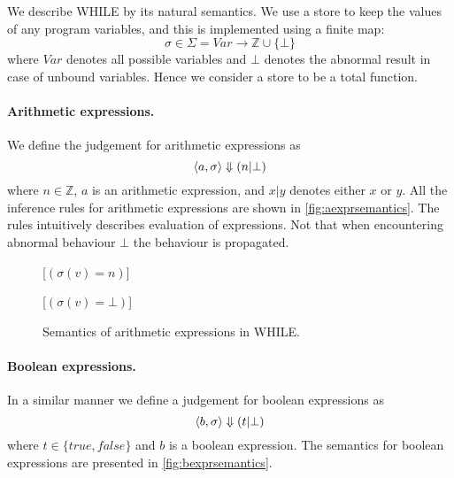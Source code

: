 We describe WHILE by its natural semantics.
We use a store to keep the values of any program variables, and this is implemented using a finite map:
$$\sigma \in \Sigma = Var \longrightarrow \mathbb{Z} \cup \{\bot\}$$
where $Var$ denotes all possible variables and $\bot$ denotes the abnormal result in case of unbound variables.
Hence we consider a store to be a total function.

\paragraph{Arithmetic expressions.}
We define the judgement for arithmetic expressions as
\[
  \langle a,\sigma \rangle \Downarrow (n | \bot)
\]
where $n \in \mathbb{Z}$, $a$ is an arithmetic expression, and $x | y$ denotes either $x$ or $y$.
All the inference rules for arithmetic expressions are shown in \autoref{fig:aexprsemantics}.
The rules intuitively describes evaluation of expressions. Not that when encountering abnormal behaviour $\bot$ the behaviour is propagated.

\begin{figure}[h!]
\inference[EACst]{}
{}

\inference[EAVar]{}
{}[$(\sigma(v) = n)$]

{}[$( \sigma(v) = \bot )$]

{}

{}

{}

\caption{Semantics of arithmetic expressions in WHILE.}
\label{fig:aexprsemantics}
\end{figure}

\paragraph{Boolean expressions.}
In a similar manner we define a judgement for boolean expressions as
$$\langle b,\sigma \rangle \Downarrow (t | \bot)$$
where $t \in \{true, false\}$ and $b$ is a boolean expression.
The semantics for boolean expressions are presented in \autoref{fig:bexprsemantics}.

